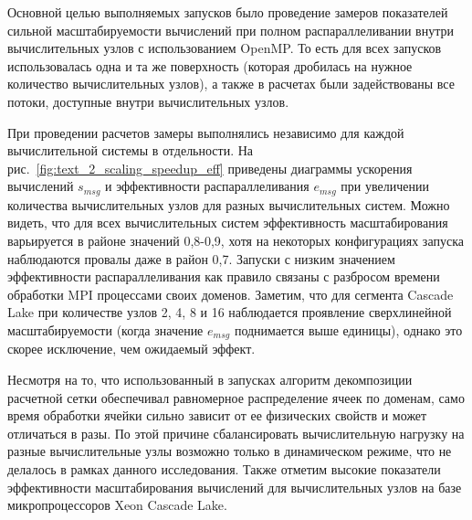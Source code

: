 Основной целью выполняемых запусков было проведение замеров показателей сильной масштабируемости вычислений при полном распараллеливании внутри вычислительных узлов с использованием OpenMP.
То есть для всех запусков использовалась одна и та же поверхность (которая дробилась на нужное количество вычислительных узлов), а также в расчетах были задействованы все потоки, доступные внутри вычислительных узлов.

При проведении расчетов замеры выполнялись независимо для каждой вычислительной системы в отдельности.
На рис.~\ref{fig:text_2_scaling_speedup_eff} приведены диаграммы ускорения вычислений $s_{msg}$ и эффективности распараллеливания $e_{msg}$ при увеличении количества вычислительных узлов для разных вычислительных систем.
Можно видеть, что для всех вычислительных систем эффективность масштабирования варьируется в районе значений 0,8-0,9, хотя на некоторых конфигурациях запуска наблюдаются провалы даже в район 0,7.
Запуски с низким значением эффективности распараллеливания как правило связаны с разбросом времени обработки MPI процессами своих доменов.
Заметим, что для сегмента Cascade Lake при количестве узлов 2, 4, 8 и 16 наблюдается проявление сверхлинейной масштабируемости (когда значение $e_{msg}$ поднимается выше единицы), однако это скорее исключение, чем ожидаемый эффект.

Несмотря на то, что использованный в запусках алгоритм декомпозиции расчетной сетки обеспечивал равномерное распределение ячеек по доменам, само время обработки ячейки сильно зависит от ее физических свойств и может отличаться в разы.
По этой причине сбалансировать вычислительную нагрузку на разные вычислительные узлы возможно только в динамическом режиме, что не делалось в рамках данного исследования.
Также отметим высокие показатели эффективности масштабирования вычислений для вычислительных узлов на базе микропроцессоров Xeon Cascade Lake.
